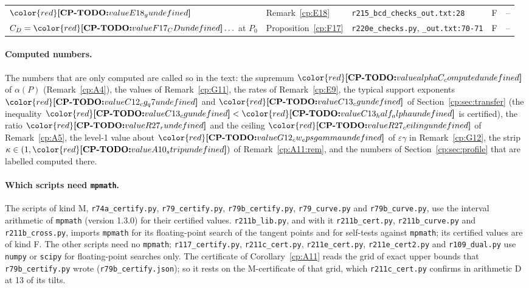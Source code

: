 \documentclass[11pt]{article}
\makeatletter
\theoremstyle{definition}
\theoremstyle{remark}
\DeclareRobustCommand{\CPTODO}[1]{{\color{red}\textbf{[CP-TODO:} #1\textbf{]}}}
\providecommand{\eps}{\varepsilon}
\newcommand{\Pzero}{P_0}                      %
\newcommand{\cpv}[1]{\ifcsname cpv@#1\endcsname\csname cpv@#1\endcsname\else\CPTODO{value #1 undefined}\fi}
\makeatother
\begin{document}
{\begin{longtable}{@{}>{\raggedright}p{}>{\raggedright}p{}>{\raggedright}p{}>{\raggedright}p{}>{\raggedright\arraybackslash}p{}@{}}
$\cpv{E18_g}$ & Remark~\ref{cp:E18} & \texttt{r215\_\allowbreak{}bcd\_\allowbreak{}checks\_\allowbreak{}out.\allowbreak{}txt:28} & F & --\\
$C_D=\cpv{F17_CD}\ldots$ at $\Pzero$ & Proposition~\ref{cp:F17} & \texttt{r220e\_\allowbreak{}checks.\allowbreak{}py}, \texttt{\_\allowbreak{}out.\allowbreak{}txt:70-71} & F & --\\
\end{longtable}}

\paragraph{Computed numbers.} The numbers that are only computed are called so in the text: the supremum $\cpv{alphaC_computed}$ of $\alpha(P)$ (Remark~\ref{cp:A4}), the values of Remark~\ref{cp:G11}, the rates of Remark~\ref{cp:E9}, the typical support exponents $\cpv{C12_cg_q7}$ and $\cpv{C13_cg}$ of Section~\ref{cp:sec:transfer} (the inequality $\cpv{C13_cg}<\cpv{C13_half_alpha}$ is certified), the ratio $\cpv{R27_r}$ and the ceiling $\cpv{R27_ceiling}$ of Remark~\ref{cp:A5}, the level-1 value about $\cpv{G12_cw_epsgamma}$ of $\eps\gamma$ in Remark~\ref{cp:G12}, the strip $\kappa\in(1,\cpv{A10_strip})$ of Remark~\ref{cp:A11:rem}, and the numbers of Section~\ref{cp:sec:profile} that are labelled computed there.

\paragraph{Which scripts need \texttt{mpmath}.} The scripts of kind M, \texttt{r74a\_\allowbreak{}certify.\allowbreak{}py}, \texttt{r79\_\allowbreak{}certify.\allowbreak{}py}, \texttt{r79b\_\allowbreak{}certify.\allowbreak{}py}, \texttt{r79\_\allowbreak{}curve.\allowbreak{}py} and \texttt{r79b\_\allowbreak{}curve.\allowbreak{}py}, use the interval arithmetic of \texttt{mpmath} (version 1.3.0) for their certified values. \texttt{r211b\_\allowbreak{}lib.\allowbreak{}py}, and with it \texttt{r211b\_\allowbreak{}cert.\allowbreak{}py}, \texttt{r211b\_\allowbreak{}curve.\allowbreak{}py} and \texttt{r211b\_\allowbreak{}cross.\allowbreak{}py}, imports \texttt{mpmath} for its floating-point search of the tangent points and for self-tests against \texttt{mpmath}; its certified values are of kind F. The other scripts need no \texttt{mpmath}; \texttt{r117\_\allowbreak{}certify.\allowbreak{}py}, \texttt{r211c\_\allowbreak{}cert.\allowbreak{}py}, \texttt{r211e\_\allowbreak{}cert.\allowbreak{}py}, \texttt{r211e\_\allowbreak{}cert2.\allowbreak{}py} and \texttt{r109\_\allowbreak{}dual.\allowbreak{}py} use \texttt{numpy} or \texttt{scipy} for floating-point searches only. The certificate of Corollary~\ref{cp:A11} reads the grid of exact upper bounds that \texttt{r79b\_\allowbreak{}certify.\allowbreak{}py} wrote (\texttt{r79b\_\allowbreak{}certify.\allowbreak{}json}); so it rests on the M-certificate of that grid, which \texttt{r211c\_\allowbreak{}cert.\allowbreak{}py} confirms in arithmetic D at 13 of its tilts.
\end{document}
